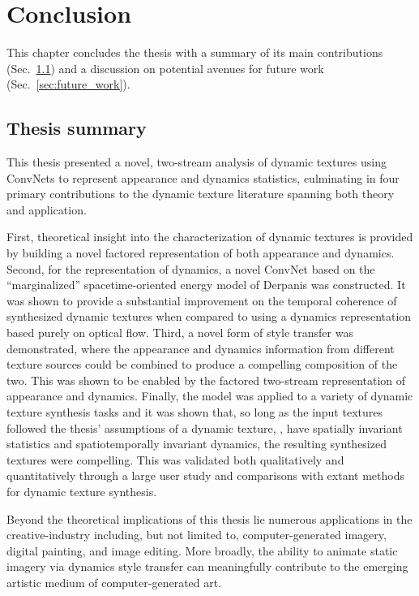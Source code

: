 \chapter{Conclusion}

This chapter concludes the thesis with a summary of its main contributions (Sec.\ \ref{sec:thesis_summary}) and a discussion on potential avenues for future work (Sec.\ \ref{sec:future_work}).

\section{Thesis summary}\label{sec:thesis_summary}

This thesis presented a novel, two-stream analysis
of dynamic textures using ConvNets to represent appearance and
dynamics statistics, culminating in four primary contributions to the dynamic texture literature spanning both theory and application.

First, theoretical insight into the characterization of dynamic textures is provided by building a novel factored representation of both appearance and dynamics. Second, for the representation of dynamics, a novel ConvNet based on the ``marginalized'' spacetime-oriented energy model of Derpanis \etal \cite{derpanis2012spacetime} was constructed. It was shown to provide a substantial improvement on the temporal coherence of synthesized dynamic textures when compared to using a dynamics representation based purely on optical flow. Third, a novel form of style transfer was demonstrated, where the appearance and dynamics information from different texture sources could be combined to produce a compelling composition of the two. This was shown to be enabled by the factored two-stream representation of appearance and dynamics. Finally, the model was applied to a variety of dynamic texture synthesis tasks and it was shown that, so long as the input textures followed the thesis' assumptions of a dynamic texture, \ie, have spatially invariant statistics and spatiotemporally invariant dynamics, the resulting synthesized textures were compelling. This was validated both qualitatively and quantitatively through a large user study and comparisons with extant methods for dynamic texture synthesis.

Beyond the theoretical implications of this thesis lie numerous applications in the creative-industry including, but not limited to, computer-generated imagery, digital painting, and image editing. More broadly, the ability 
to animate static imagery via dynamics style transfer can meaningfully contribute 
to the emerging artistic medium of computer-generated art.


